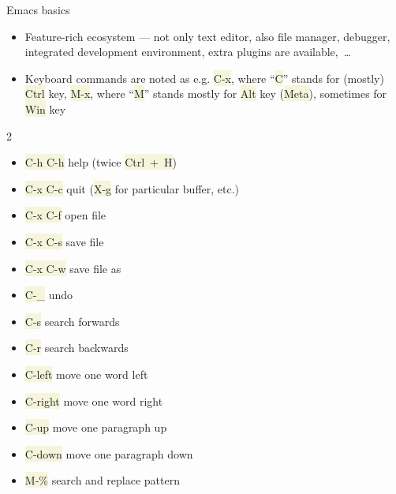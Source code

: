 \documentclass[compress, xelatex, 11pt, xcolor=svgnames, aspectratio=169, url={hyphens, lowtilde}]{beamer}
\renewcommand{\texttt}[1]{\colorbox{Beige}{{\ttfamily #1}}}
\begin{document}
\begin{frame}{Emacs basics}
	\begin{itemize}
		\item Feature-rich ecosystem --- not only text editor, also file manager, debugger, integrated development environment, extra plugins are available,~\ldots
		\item Keyboard commands are noted as e.g. \texttt{C-x}, where \enquote{\texttt{C}} stands for (mostly) \texttt{Ctrl} key, \texttt{M-x}, where \enquote{\texttt{M}} stands mostly for \texttt{Alt} key (\texttt{Meta}), sometimes for \texttt{Win} key
	\end{itemize}
	\begin{multicols}{2}
		\begin{itemize}
			\item \texttt{C-h C-h} help (twice \texttt{Ctrl~+~H})
			\item \texttt{C-x C-c} quit (\texttt{X-g} for particular buffer, etc.)
			\item \texttt{C-x C-f} open file
			\item \texttt{C-x C-s} save file
			\item \texttt{C-x C-w} save file as
			\item \texttt{C-\_} undo
			\item \texttt{C-s} search forwards
			\item \texttt{C-r} search backwards
			\item \texttt{C-left} move one word left
			\item \texttt{C-right} move one word right
			\item \texttt{C-up} move one paragraph up
			\item \texttt{C-down} move one paragraph down
			\item \texttt{M-\%} search and replace pattern
		\end{itemize}
	\end{multicols}
\end{frame}
\end{document}
